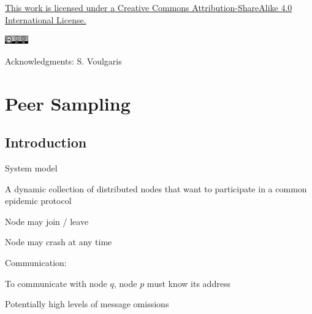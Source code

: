 {
\begin{frame}[noframenumbering]
	\titlepage
	\begin{center}
		\href{http://creativecommons.org/licenses/by-sa/4.0/}{This work is licensed under a Creative Commons Attribution-ShareAlike 4.0 International License.}
		
		\smallskip
		\includegraphics[width=1cm]{figs/cc.png}

	\bigskip
		{\tiny
			Acknowledgments: S. Voulgaris
		}
	\end{center}


\end{frame}
}






\section{Peer Sampling}

\subsection{Introduction}

\begin{frame}{System model}

\transdissolve

\BIL
\item A dynamic collection of distributed nodes that want to participate in a common epidemic protocol
\BI
\item Node may join / leave
\item Node may crash at any time
\EI
\item Communication:
\BI
\item To communicate with node $q$, node $p$ must know its address
\item Potentially high levels of message omissions
\EI
\EIL

\end{frame}

